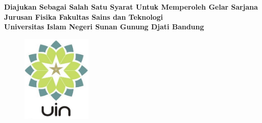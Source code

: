 %
%
\begin{titlepage}
\begin{center}
\large \bf \Judul \\
\vspace{2cm}
{\normalsize \bf \Model}\\
\vspace{1cm}
{\small \bf Diajukan Sebagai Salah Satu Syarat Untuk Memperoleh Gelar Sarjana \\
            Jurusan Fisika Fakultas Sains dan Teknologi \\
            Universitas Islam Negeri Sunan Gunung Djati Bandung \\}
\vspace{1cm}
\begin{figure}[h]
	\centering
		\includegraphics[width=0.30\textwidth]{template/uin}
	\label{fig:uin}
\end{figure}
{\small \bf \underline{\Peneliti}  \\
\nim}\\
\vspace{2cm}
{\normalsize \bf \Jur  \\
\Fak  \\
\Kampus  \\
\tahun}
\end{center}
\end{titlepage}
%